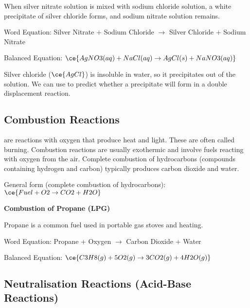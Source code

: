 {\begin{example}
When silver nitrate solution is mixed with sodium chloride solution, a white precipitate of silver chloride forms, and sodium nitrate solution remains.

Word Equation: Silver Nitrate + Sodium Chloride $\rightarrow$ Silver Chloride + Sodium Nitrate

Balanced Equation: $\ce{AgNO3(aq) + NaCl(aq) \rightarrow AgCl(s) + NaNO3(aq)}$

Silver chloride ($\ce{AgCl}$) is insoluble in water, so it precipitates out of the solution. We can use  to predict whether a precipitate will form in a double displacement reaction.
\end{example}

\subsection{Combustion Reactions}


 are reactions with oxygen that produce heat and light. These are often called burning. Combustion reactions are usually exothermic and involve fuels reacting with oxygen from the air. Complete combustion of hydrocarbons (compounds containing hydrogen and carbon) typically produces carbon dioxide and water.

General form (complete combustion of hydrocarbons): $\ce{Fuel + O2 \rightarrow CO2 + H2O}$

\begin{example}
\textbf{Combustion of Propane (LPG)}

Propane is a common fuel used in portable gas stoves and heating.

Word Equation: Propane + Oxygen $\rightarrow$ Carbon Dioxide + Water

Balanced Equation: $\ce{C3H8(g) + 5O2(g) \rightarrow 3CO2(g) + 4H2O(g)}$
\end{example}

\subsection{Neutralisation Reactions (Acid-Base Reactions)}


}
